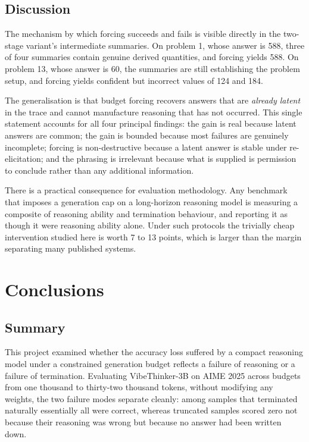 \documentclass[12pt,a4paper,oneside]{report}
\begin{document}
\section{Discussion}

The mechanism by which forcing succeeds and fails is visible directly in the
two-stage variant's intermediate summaries. On problem 1, whose answer is 588,
three of four summaries contain genuine derived quantities, and forcing yields
588. On problem 13, whose answer is 60, the summaries are still establishing the
problem setup, and forcing yields confident but incorrect values of 124 and 184.

The generalisation is that budget forcing recovers answers that are
\emph{already latent} in the trace and cannot manufacture reasoning that has not
occurred. This single statement accounts for all four principal findings: the
gain is real because latent answers are common; the gain is bounded because most
failures are genuinely incomplete; forcing is non-destructive because a latent
answer is stable under re-elicitation; and the phrasing is irrelevant because
what is supplied is permission to conclude rather than any additional
information.

There is a practical consequence for evaluation methodology. Any benchmark that
imposes a generation cap on a long-horizon reasoning model is measuring a
composite of reasoning ability and termination behaviour, and reporting it as
though it were reasoning ability alone. Under such protocols the trivially cheap
intervention studied here is worth 7 to 13 points, which is larger than the
margin separating many published systems.

\chapter{Conclusions}

\section{Summary}

This project examined whether the accuracy loss suffered by a compact reasoning
model under a constrained generation budget reflects a failure of reasoning or a
failure of termination. Evaluating VibeThinker-3B on AIME 2025 across budgets
from one thousand to thirty-two thousand tokens, without modifying any weights,
the two failure modes separate cleanly: among samples that terminated naturally
essentially all were correct, whereas truncated samples scored zero not because
their reasoning was wrong but because no answer had been written down.
\end{document}
